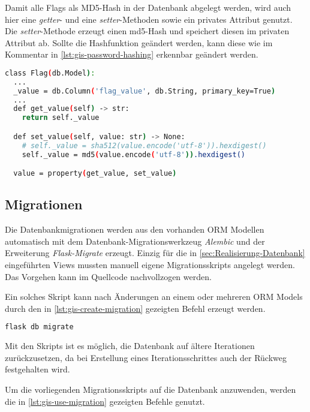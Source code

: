 Damit alle Flags als MD5-Hash in der Datenbank abgelegt werden, wird auch hier eine \textit{getter}- und eine \textit{setter}-Methoden sowie ein privates Attribut genutzt. Die \textit{setter}-Methode erzeugt einen md5-Hash und speichert diesen im privaten Attribut ab. Sollte die Hashfunktion geändert werden, kann diese wie im Kommentar in \autoref{lst:gis-password-hashing} erkennbar geändert werden.

\begin{lstlisting}[language=bash, frame=single, caption={GIS Hashen der Flags}, captionpos=b, label={lst:gis-password-hashing}]
class Flag(db.Model):
  ...
  _value = db.Column('flag_value', db.String, primary_key=True)
  ...
  def get_value(self) -> str:
    return self._value

  def set_value(self, value: str) -> None:
    # self._value = sha512(value.encode('utf-8')).hexdigest()
    self._value = md5(value.encode('utf-8')).hexdigest()

  value = property(get_value, set_value)
\end{lstlisting}

\subsection{Migrationen}\label{sub:realisierung-migration}

Die Datenbankmigrationen werden aus den vorhanden ORM Modellen automatisch mit dem Datenbank-Migrationswerkzeug \textit{Alembic} und der Erweiterung \textit{Flask-Migrate} erzeugt. Einzig für die in \autoref{sec:Realisierung-Datenbank} eingeführten Views mussten manuell eigene Migrationsskripts angelegt werden. Das Vorgehen kann im Quellcode nachvollzogen werden.

Ein solches Skript kann nach Änderungen an einem oder mehreren ORM Models durch den in \ref{lst:gis-create-migration} gezeigten Befehl erzeugt werden.

\begin{lstlisting}[language=bash, frame=single, caption={GIS Erzeugung eines Migrationsskripts}, captionpos=b, label={lst:gis-create-migration}]
flask db migrate
\end{lstlisting}

Mit den Skripts ist es möglich, die Datenbank auf ältere Iterationen zurückzusetzen, da bei Erstellung eines Iterationsschrittes auch der Rückweg festgehalten wird.

Um die vorliegenden Migrationsskripts auf die Datenbank anzuwenden, werden die in \autoref{lst:gis-use-migration} gezeigten Befehle genutzt.

